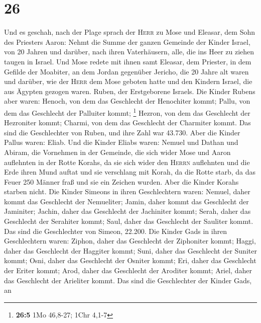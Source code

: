 \hypertarget{section-25}{%
\section{26}\label{section-25}}

 Und es geschah, nach der Plage sprach der \textsc{Herr}
zu Mose und Eleasar, dem Sohn des Priesters Aaron:  Nehmt
die Summe der ganzen Gemeinde der Kinder Israel, von 20 Jahren und
darüber, nach ihren Vaterhäusern, alle, die ins Heer zu ziehen taugen in
Israel.  Und Mose redete mit ihnen samt Eleasar, dem
Priester, in dem Gefilde der Moabiter, an dem Jordan gegenüber Jericho,
 die 20 Jahre alt waren und darüber, wie der \textsc{Herr}
dem Mose geboten hatte und den Kindern Israel, die aus Ägypten gezogen
waren.  Ruben, der Erstgeborene Israels. Die Kinder Rubens
aber waren: Henoch, von dem das Geschlecht der Henochiter kommt; Pallu,
von dem das Geschlecht der Palluiter kommt; \footnote{\textbf{26:5} 1Mo
  46,8-27; 1Chr 4,1-7}  Hezron, von dem das Geschlecht der
Hezroniter kommt; Charmi, von dem das Geschlecht der Charmiter kommt.
 Das sind die Geschlechter von Ruben, und ihre Zahl war
43.730.  Aber die Kinder Pallus waren: Eliab.
 Und die Kinder Eliabs waren: Nemuel und Dathan und
Abiram, die Vornehmen in der Gemeinde, die sich wider Mose und Aaron
auflehnten in der Rotte Korahs, da sie sich wider den \textsc{Herrn}
auflehnten  und die Erde ihren Mund auftat und sie
verschlang mit Korah, da die Rotte starb, da das Feuer 250 Männer fraß
und sie ein Zeichen wurden.  Aber die Kinder Korahs
starben nicht.  Die Kinder Simeons in ihren Geschlechtern
waren: Nemuel, daher kommt das Geschlecht der Nemueliter; Jamin, daher
kommt das Geschlecht der Jaminiter; Jachin, daher das Geschlecht der
Jachiniter kommt;  Serah, daher das Geschlecht der
Serahiter kommt; Saul, daher das Geschlecht der Sauliter kommt.
 Das sind die Geschlechter von Simeon, 22.200.
 Die Kinder Gads in ihren Geschlechtern waren: Ziphon,
daher das Geschlecht der Ziphoniter kommt; Haggi, daher das Geschlecht
der Haggiter kommt; Suni, daher das Geschlecht der Suniter kommt;
 Osni, daher das Geschlecht der Osniter kommt; Eri, daher
das Geschlecht der Eriter kommt;  Arod, daher das
Geschlecht der Aroditer kommt; Ariel, daher das Geschlecht der Arieliter
kommt.  Das sind die Geschlechter der Kinder Gads, an

